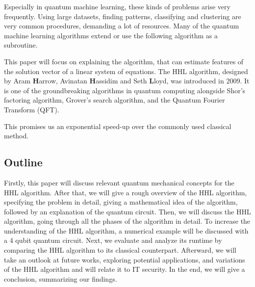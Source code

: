 Especially in quantum machine learning, these kinds of problems arise very frequently. 
Using large datasets, finding patterns, classifying and clustering are very common procedures, demanding a lot of resources. 
Many of the quantum machine learning algorithms extend or use the following algorithm as a subroutine. 

This paper will focus on explaining the algorithm, that can estimate features of the solution vector of a linear system of equations.
The HHL algorithm, designed by Aram \textbf{H}arrow, Avinatan \textbf{H}assidim and Seth \textbf{L}loyd, was introduced in 2009. 
It is one of the groundbreaking algorithms in quantum computing alongside Shor's factoring algorithm, Grover's search algorithm, and the Quantum Fourier Transform (QFT).


This promises us an exponential speed-up over the commonly used classical method.

\subsection{Outline}
Firstly, this paper will discuss relevant quantum mechanical concepts for the HHL algorithm.
After that, we will give a rough overview of the HHL algorithm, specifying the problem in detail, giving a mathematical idea of the algorithm, followed by an explanation of the quantum circuit.
Then, we will discuss the HHL algorithm, going through all the phases of the algorithm in detail. 
To increase the understanding of the HHL algorithm, a numerical example will be discussed with a 4 qubit quantum circuit.
Next, we evaluate and analyze its runtime by comparing the HHL algorithm to its classical counterpart. 
Afterward, we will take an outlook at future works, exploring potential applications, and variations of the HHL algorithm and will relate it to IT security. 
In the end, we will give a conclusion, summarizing our findings. 


